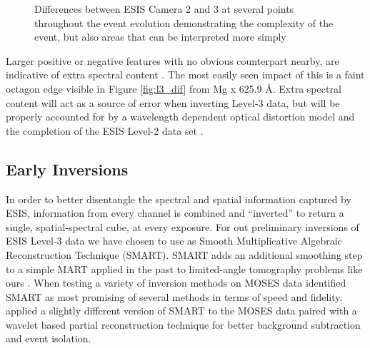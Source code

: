    	\begin{figure}[htb!]
    		\centering
    		\caption{Differences between ESIS Camera 2 and 3 at several points throughout the event evolution demonstrating the complexity of the event, but also areas that can be interpreted more simply}
    		\label{fig:main_event}
    	\end{figure}
    	
    	Larger positive or negative features with no obvious counterpart nearby, are indicative of extra spectral content \citep{RustPhD,Parker2021}.
    	The most easily seen impact of this is a faint octagon edge visible in Figure \ref{fig:l3_dif} from Mg {\sc x} 625.9 \AA.
    	Extra spectral content will act as a source of error when inverting Level-3 data, but will be properly accounted for by a wavelength dependent optical distortion model and the completion of the ESIS Level-2 data set \citep{Smart2022}. 	
    
    \subsection{Early Inversions}
    	In order to better disentangle the spectral and spatial information captured by ESIS, information from every channel is combined and ``inverted'' to return a single, spatial-spectral cube, at every exposure.
    	For out preliminary inversions of ESIS Level-3 data we have chosen to use as Smooth Multiplicative Algebraic Reconstruction Technique (SMART).
    	SMART adds an additional smoothing step to a simple MART applied in the past to limited-angle tomography problems like ours \citep{Okamoto1991,Verhoeven1993}.
    	When testing a variety of inversion methods on MOSES data \citet{FoxPhD} identified SMART as most promising of several methods in terms of speed and fidelity.
    	\citet{RustPhD} applied a slightly different version of SMART to the MOSES data paired with a wavelet based partial reconstruction technique for better background subtraction and event isolation.
    	
